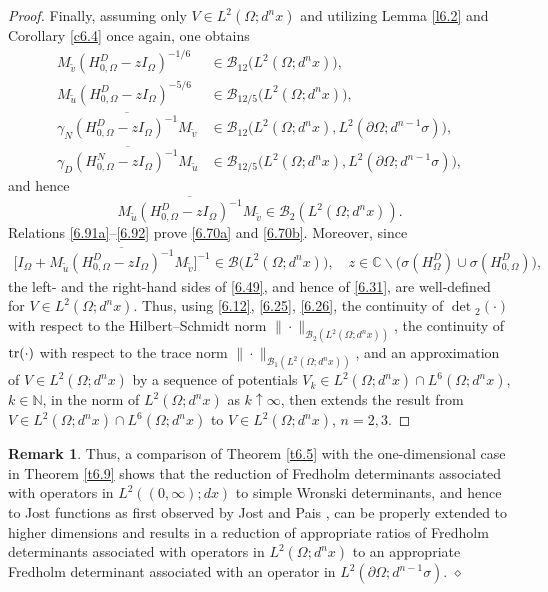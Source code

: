 \documentclass[reqno,10pt, centertags]{amsart}
\newcommand{\bbN}{{\mathbb{N}}}
\newcommand{\bbC}{{\mathbb{C}}}
\newcommand{\cB}{{\mathcal B}}
\newcommand{\lb}{\label}
\newcommand{\ol}{\overline}
\newcommand{\wti}{\widetilde}
\newcommand{\ga}{\gamma}
\newcommand{\si}{\sigma}
\newcommand{\Om}{\Omega}
\newcommand{\dOm}{{\partial\Omega}}
\newcommand{\tr}{\text{\rm{tr}}}
\numberwithin{equation}{section}
\theoremstyle{definition}
\newtheorem{remark}[theorem]{Remark}
\begin{document}
\begin{proof}
Finally, assuming only $V\in L^2(\Om;d^n x)$ and utilizing Lemma
\ref{l6.2} and Corollary \ref{c6.4} once again, one obtains
\begin{align}
M_{\wti v}(H_{0,\Om}^D-zI_{\Om})^{-1/6} &\in
\cB_{12}\big(L^2(\Om;d^nx)\big), \lb{6.91a}
\\
M_{\wti u}(H_{0,\Om}^D-zI_{\Om})^{-5/6} &\in
\cB_{12/5}\big(L^2(\Om;d^nx)\big), \lb{6.91b}
\\
\ol{\ga_N(H_{0,\Om}^D-zI_{\Om})^{-1}M_{\wti v}} &\in
\cB_{12}\big(L^2(\Om;d^nx),L^2(\dOm;d^{n-1}\si)\big), \lb{6.91c}
\\
\ol{\ga_D (H_{0,\Om}^N-zI_{\Om})^{-1}M_{\wti u}} &\in
\cB_{12/5}\big(L^2(\Om;d^nx),L^2(\dOm;d^{n-1}\si)\big), \lb{6.91d}
\end{align}
and hence
\begin{equation}
\ol{M_{\wti u}(H_{0,\Om}^D-zI_{\Om})^{-1}M_{\wti v}} \in
\cB_2(L^2(\Om;d^nx)).  \lb{6.92}
\end{equation}
Relations \eqref{6.91a}--\eqref{6.92} prove \eqref{6.70a} and
\eqref{6.70b}. Moreover, since
\begin{align}
\big[I_{\Om}+\ol{M_{\wti u}(H_{0,\Om}^D-zI_{\Om})^{-1}
M_{\wti v}}\big]^{-1} \in
\cB\big(L^2(\Om;d^nx)\big), \quad z\in\bbC\backslash
\big(\si(H_{\Om}^D)\cup\si(H_{0,\Om}^D)\big),
\end{align}
the left- and the right-hand sides of \eqref{6.49}, and hence of
\eqref{6.31}, are well-defined for $V\in L^2(\Om;d^nx)$. Thus,
using \eqref{6.12}, \eqref{6.25}, \eqref{6.26}, the continuity of
$\det{}_2(\cdot)$ with respect to the Hilbert--Schmidt norm
$\|\cdot\|_{\cB_2(L^2(\Om;d^nx))}$, the continuity of
$\tr(\cdot)$ with respect to the trace norm
$\|\cdot\|_{\cB_1(L^2(\Om;d^nx))}$, and an approximation of $V\in
L^2(\Om;d^nx)$ by a sequence of potentials $V_k \in
L^2(\Om;d^nx)\cap L^6(\Om;d^nx)$, $k\in\bbN$, in the norm of
$L^2(\Om;d^nx)$ as $k\uparrow\infty$, then extends the result from
$V\in L^2(\Om;d^nx)\cap L^6(\Om;d^nx)$ to $V\in L^2(\Om;d^nx)$, $n=2,3$.
\end{proof}

\begin{remark}  \lb{r6.12}
Thus, a comparison of Theorem \ref{t6.5} with the one-dimensional case in
Theorem \ref{t6.9} shows that the reduction of Fredholm determinants
associated with operators in $L^2((0,\infty);dx)$ to simple Wronski
determinants, and hence to Jost functions as first observed by Jost and
Pais \cite{JP51}, can be properly extended to higher dimensions and
results in a reduction of appropriate ratios of Fredholm determinants
associated with operators in $L^2(\Om;d^nx)$ to an appropriate
Fredholm determinant associated with an operator in
$L^2(\partial\Om;d^{n-1}\sigma)$. \hfill $\diamond$
\end{remark}
\end{document}
